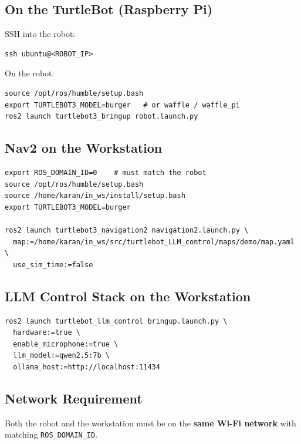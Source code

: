 \documentclass[12pt,a4paper]{report}
\begin{document}
\subsection{On the TurtleBot (Raspberry Pi)}

SSH into the robot:

\begin{lstlisting}[style=bashstyle]
ssh ubuntu@<ROBOT_IP>
\end{lstlisting}

On the robot:

\begin{lstlisting}[style=bashstyle, caption={TurtleBot bringup on the robot}]
source /opt/ros/humble/setup.bash
export TURTLEBOT3_MODEL=burger   # or waffle / waffle_pi
ros2 launch turtlebot3_bringup robot.launch.py
\end{lstlisting}

\subsection{Nav2 on the Workstation}

\begin{lstlisting}[style=bashstyle, caption={Run Nav2 on the workstation}]
export ROS_DOMAIN_ID=0    # must match the robot
source /opt/ros/humble/setup.bash
source /home/karan/in_ws/install/setup.bash
export TURTLEBOT3_MODEL=burger

ros2 launch turtlebot3_navigation2 navigation2.launch.py \
  map:=/home/karan/in_ws/src/turtlebot_LLM_control/maps/demo/map.yaml \
  use_sim_time:=false
\end{lstlisting}

\subsection{LLM Control Stack on the Workstation}

\begin{lstlisting}[style=bashstyle, caption={Run the LLM control stack}]
ros2 launch turtlebot_llm_control bringup.launch.py \
  hardware:=true \
  enable_microphone:=true \
  llm_model:=qwen2.5:7b \
  ollama_host:=http://localhost:11434
\end{lstlisting}

\subsection{Network Requirement}

Both the robot and the workstation must be on the \textbf{same Wi-Fi network}
with matching \texttt{ROS\_DOMAIN\_ID}.
\end{document}
